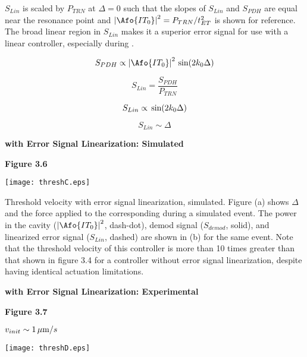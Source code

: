 \documentclass[12pt]{article}
\newcommand{\tit}[1]{\begin{center}\textbf{\Huge{#1}}\end{center}\vspace{1ex}}
\newcommand{\fig}[1]{\textbf{\large{Figure #1}}}
\begin{document}
 $S_{Lin}$ is scaled by $P_{TRN}$ at $\Delta = 0$ such that
  the slopes of $S_{Lin}$ and $S_{PDH}$ are equal near the
  resonance point and
  $\abs{\Afo{IT_0}}^2 = P_{TRN} / t_{ET}^2$ is shown for reference.
 The broad linear region in $S_{Lin}$ makes it a superior
  error signal for use with a linear controller,
  especially during \la{}.

\begin{equation}
S_{PDH} \propto \abs{\Afo{IT_0}}^2 \fsin{2 \wn_0 \Delta}
\end{equation}

\begin{equation}
S_{Lin} = \frac{S_{PDH}}{P_{TRN}}
\end{equation}

\begin{equation}
S_{Lin} \propto \,{\textrm{sin}}\!\left( {2 k_0 \Delta} \right)
\end{equation}

\begin{equation}
S_{Lin} \sim \Delta
\end{equation}


\newpage
\tit{\LA{} with Error Signal Linearization: Simulated}

\fig{3.6}

\begin{center}
\texttt{[image: threshC.eps]}
\end{center}

 Threshold velocity with error signal linearization, simulated.
 Figure (a) shows $\Delta$ and the force applied to the corresponding
  \dof{} during a simulated \la{} event.
 The power in the cavity ($\abs{\Afo{IT_0}}^2$, dash-dot),
  demod signal ($S_{demod}$, solid),
  and linearized error signal ($S_{Lin}$, dashed)
  are shown in (b) for the same event.
 Note that the threshold velocity of this controller is more than
  10 times greater than that shown in figure 3.4 for
  a controller without error signal linearization,
  despite having identical actuation limitations.

\newpage
\tit{\LA{} with Error Signal Linearization: Experimental}

\fig{3.7}

\begin{center}
$v_{init} \sim 1 \,\mbox{$\mu$m}/s$
\end{center}
\begin{center}
\texttt{[image: threshD.eps]}
\end{center}
\end{document}
